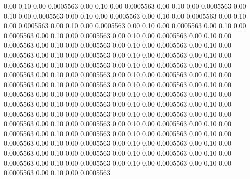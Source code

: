    0.00    0.10    0.00   0.0005563
   0.00    0.10    0.00   0.0005563
   0.00    0.10    0.00   0.0005563
   0.00    0.10    0.00   0.0005563
   0.00    0.10    0.00   0.0005563
   0.00    0.10    0.00   0.0005563
   0.00    0.10    0.00   0.0005563
   0.00    0.10    0.00   0.0005563
   0.00    0.10    0.00   0.0005563
   0.00    0.10    0.00   0.0005563
   0.00    0.10    0.00   0.0005563
   0.00    0.10    0.00   0.0005563
   0.00    0.10    0.00   0.0005563
   0.00    0.10    0.00   0.0005563
   0.00    0.10    0.00   0.0005563
   0.00    0.10    0.00   0.0005563
   0.00    0.10    0.00   0.0005563
   0.00    0.10    0.00   0.0005563
   0.00    0.10    0.00   0.0005563
   0.00    0.10    0.00   0.0005563
   0.00    0.10    0.00   0.0005563
   0.00    0.10    0.00   0.0005563
   0.00    0.10    0.00   0.0005563
   0.00    0.10    0.00   0.0005563
   0.00    0.10    0.00   0.0005563
   0.00    0.10    0.00   0.0005563
   0.00    0.10    0.00   0.0005563
   0.00    0.10    0.00   0.0005563
   0.00    0.10    0.00   0.0005563
   0.00    0.10    0.00   0.0005563
   0.00    0.10    0.00   0.0005563
   0.00    0.10    0.00   0.0005563
   0.00    0.10    0.00   0.0005563
   0.00    0.10    0.00   0.0005563
   0.00    0.10    0.00   0.0005563
   0.00    0.10    0.00   0.0005563
   0.00    0.10    0.00   0.0005563
   0.00    0.10    0.00   0.0005563
   0.00    0.10    0.00   0.0005563
   0.00    0.10    0.00   0.0005563
   0.00    0.10    0.00   0.0005563
   0.00    0.10    0.00   0.0005563
   0.00    0.10    0.00   0.0005563
   0.00    0.10    0.00   0.0005563
   0.00    0.10    0.00   0.0005563
   0.00    0.10    0.00   0.0005563
   0.00    0.10    0.00   0.0005563
   0.00    0.10    0.00   0.0005563
   0.00    0.10    0.00   0.0005563
   0.00    0.10    0.00   0.0005563
   0.00    0.10    0.00   0.0005563
   0.00    0.10    0.00   0.0005563
   0.00    0.10    0.00   0.0005563
